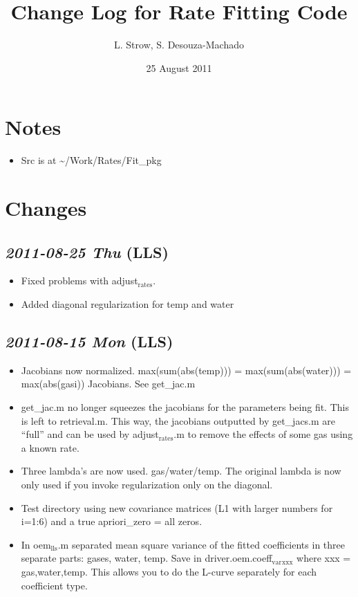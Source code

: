 \documentclass[11pt]{article}
\title{Change Log for Rate Fitting Code}
\author{L. Strow, S. Desouza-Machado}
\date{25 August 2011}
\begin{document}
\maketitle


\section{Notes}
\label{sec-1}


\begin{itemize}
\item Src is at \~{}/Work/Rates/Fit\_pkg
\end{itemize}
\section{Changes}
\label{sec-2}
\subsection{\textit{2011-08-25 Thu} (LLS)}
\label{sec-2_1}


\begin{itemize}
\item Fixed problems with adjust$_{\mathrm{rates}}$.
\item Added diagonal regularization for temp and water
\end{itemize}
\subsection{\textit{2011-08-15 Mon} (LLS)}
\label{sec-2_2}


\begin{itemize}
\item Jacobians now normalized.  max(sum(abs(temp))) =
  max(sum(abs(water))) = max(abs(gasi)) Jacobians.  See get\_jac.m
\item get\_jac.m no longer squeezes the jacobians for the parameters being
  fit.  This is left to retrieval.m.  This way, the jacobians
  outputted by get\_jacs.m are ``full'' and can be used by adjust$_{\mathrm{rates}}$.m
  to remove the effects of some gas using a known rate.
\item Three lambda's are now used.  gas/water/temp.  The original lambda
  is now only used if you invoke regularization only on the diagonal.
\item Test directory using new covariance matrices (L1 with larger numbers
  for i=1:6) and a true apriori\_zero = all zeros.
\item In oem$_{\mathrm{lls}}$.m separated mean square variance of the fitted
  coefficients in three separate parts: gases, water, temp.  Save in
  driver.oem.coeff$_{\mathrm{var}}$$_{\mathrm{xxx}}$ where xxx = gas,water,temp.  This allows
  you to do the L-curve separately for each coefficient type.
\end{itemize}
\end{document}
